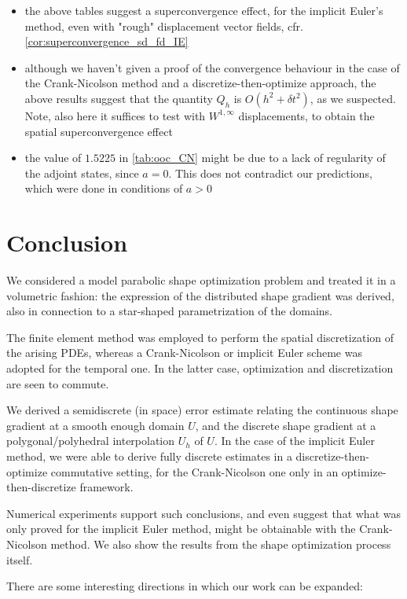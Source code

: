 \documentclass[english,a4paper,9pt,oneside]{scrbook}	%
\theoremstyle{break}
\theoremstyle{remark}
\begin{document}
\begin{itemize}
	\item the above tables suggest a superconvergence effect, for the implicit Euler's method, even with "rough" displacement vector fields, cfr. \cref{cor:superconvergence_sd_fd_IE}
	\item although we haven't given a proof of the convergence behaviour in the case of the Crank-Nicolson method and a discretize-then-optimize approach, the above results suggest that the quantity $Q_h$ is $O(h^2+\delta t^2)$, as we suspected. Note, also here it suffices to test with $W^{1,\infty}$ displacements, to obtain the spatial superconvergence effect
	\item the value of $1.5225$ in \cref{tab:ooc_CN} might be due to a lack of regularity of the adjoint states, since $a=0$. This does not contradict our predictions, which were done in conditions of $a>0$
\end{itemize}

\chapter{Conclusion}
\label{chap:conclusion}

We considered a model parabolic shape optimization problem and treated it in a volumetric fashion: the expression of the distributed shape gradient was derived, also in connection to a star-shaped parametrization of the domains.

The finite element method was employed to perform the spatial discretization of the arising PDEs, whereas a Crank-Nicolson or implicit Euler scheme was adopted for the temporal one. In the latter case, optimization and discretization are seen to commute.

We derived a semidiscrete (in space) error estimate relating the continuous shape gradient at a smooth enough domain $U$, and the discrete shape gradient at a polygonal/polyhedral interpolation $U_h$ of $U$. In the case of the implicit Euler method, we were able to derive fully discrete estimates in a discretize-then-optimize commutative setting, for the Crank-Nicolson one only in an optimize-then-discretize framework.

Numerical experiments support such conclusions, and even suggest that what was only proved for the implicit Euler method, might be obtainable with the Crank-Nicolson method. We also show the results from the shape optimization process itself.

There are some interesting directions in which our work can be expanded:
\end{document}
